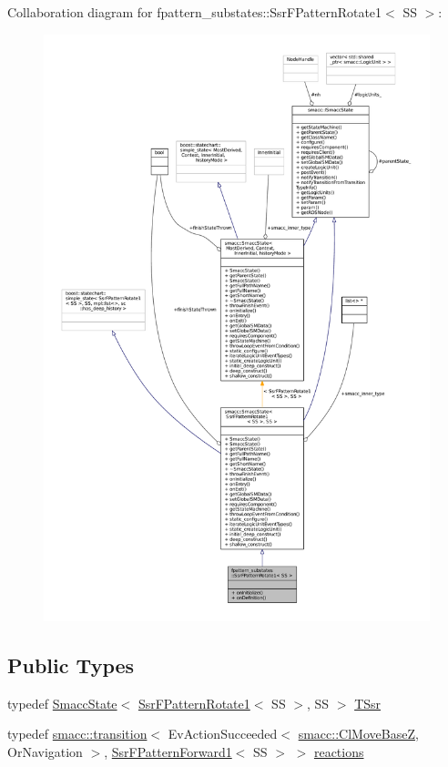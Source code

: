 Collaboration diagram for fpattern\+\_\+substates\+:\+:Ssr\+F\+Pattern\+Rotate1$<$ SS $>$\+:
\nopagebreak
\begin{figure}[H]
\begin{center}
\leavevmode
\includegraphics[width=350pt]{structfpattern__substates_1_1SsrFPatternRotate1__coll__graph}
\end{center}
\end{figure}
\subsection*{Public Types}
\begin{DoxyCompactItemize}
\item 
typedef \hyperlink{classSmaccState}{Smacc\+State}$<$ \hyperlink{structfpattern__substates_1_1SsrFPatternRotate1}{Ssr\+F\+Pattern\+Rotate1}$<$ SS $>$, SS $>$ \hyperlink{structfpattern__substates_1_1SsrFPatternRotate1_ad9030085117e1a9931a7148f4ab31f61}{T\+Ssr}
\item 
typedef \hyperlink{classsmacc_1_1transition}{smacc\+::transition}$<$ Ev\+Action\+Succeeded$<$ \hyperlink{classsmacc_1_1ClMoveBaseZ}{smacc\+::\+Cl\+Move\+BaseZ}, Or\+Navigation $>$, \hyperlink{structfpattern__substates_1_1SsrFPatternForward1}{Ssr\+F\+Pattern\+Forward1}$<$ SS $>$ $>$ \hyperlink{structfpattern__substates_1_1SsrFPatternRotate1_a5e535d319123c4e3805a110a569a2d40}{reactions}
\end{DoxyCompactItemize}
